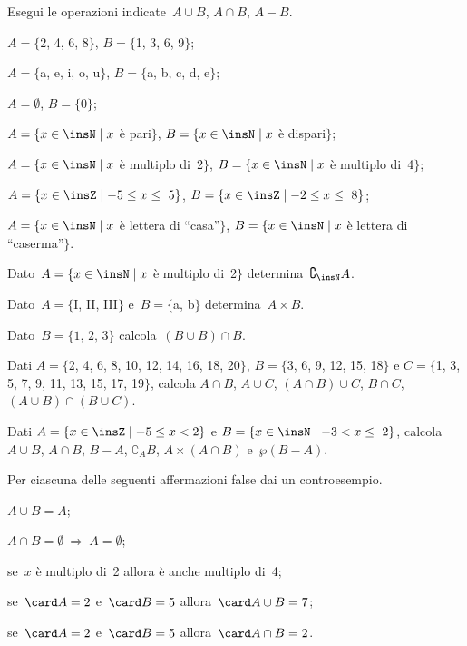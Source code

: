 \begin{esercizio}
Esegui le operazioni indicate~$A\cup B$, $A\cap B$, $A-B$.

\begin{enumeratea}
\item $A=\{$2, 4, 6, 8$\}$, $B=\{$1, 3, 6, 9$\}$;
\item $A=\{$a, e, i, o, u$\}$, $B=\{$a, b, c, d, e$\}$;
\item $A=\emptyset$, $B=\{0\}$;
\item $A=\{x\in\insN\mid x$ è pari$\}$, $B=\{x\in\insN\mid x$ è dispari$\}$;
\item $A=\{x\in\insN\mid x$ è multiplo di~2$\}$, $B=\{x\in\insN\mid x$ è multiplo di~4$\}$;
\item $A=\{x\in\insZ\mid -5\le x\le~5\}$, $B=\{x\in\insZ\mid -2\le x\le~8\}$;
\item $A=\{x\in\insN\mid x$ è lettera di ``casa''$\}$, $B=\{x\in\insN\mid x$ è lettera di ``caserma''$\}$.
\end{enumeratea}
\end{esercizio}

\begin{esercizio}
Dato~$A=\{x\in\insN\mid x$ è multiplo di~2$\}$ determina~$\complement_{\insN}A$.
\end{esercizio}

\begin{esercizio}
Dato~$A=\{$I, II, III$\}$ e~$B=\{$a, b$\}$ determina~$A\times B$.
\end{esercizio}

\begin{esercizio}
Dato~$B=\{\text{1, 2, 3}\}$ calcola~$(B\cup B)\cap B$.
\end{esercizio}

\begin{esercizio}
Dati $A=\{$2, 4, 6, 8, 10, 12, 14, 16, 18, 20$\}$, $B=\{$3, 6, 9, 12, 15, 18$\}$ e
$C=\{$1, 3, 5, 7, 9, 11, 13, 15, 17, 19$\}$, calcola
$A\cap B$, $A\cup C$, $(A\cap B)\cup C$, $B\cap C$, $(A\cup B)\cap(B\cup C)$.
\end{esercizio}

\begin{esercizio}
Dati $A=\{x\in\insZ\mid -5\le x<2\}$ e $B=\{x\in\insN\mid -3<x\le~2\}$, calcola
$A\cup B$, $A\cap B$, $B-A$, $\complement_{A}B$, $A\times(A\cap B)$ e~$\wp (B-A)$.
\end{esercizio}

\begin{esercizio}
Per ciascuna delle seguenti affermazioni false dai un controesempio.

\begin{enumeratea}
 \item $A\cup B=A$;
\item $A\cap B=\emptyset\:\Rightarrow\:A=\emptyset $;
\item se~$x$ è multiplo di~2 allora è anche multiplo di~4;
\item se~$\card A =2$ e~$\card B = 5$ allora~$\card A\cup B=7$;
\item se~$\card A =2$ e~$\card B = 5$ allora~$\card A\cap B=2$.
\end{enumeratea}
\end{esercizio}

